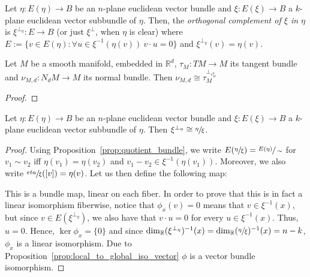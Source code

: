 \begin{definition} Let $\eta:E(\eta)\to B$ be an $n$-plane euclidean vector bundle and $\xi:E(\xi)\to B$ a $k$-plane euclidean vector subbundle of $\eta$. Then, the \emph{orthogonal complement of $\xi$ in $\eta$} is $\xi^{\perp_{\eta}}:E\to B$ (or just $\xi^{\perp}$, when $\eta$ is clear) where $E:=\{v\in E(\eta):\forall u\in\xi^{-1}(\eta(v))\ v\cdot u=0\}$ and $\xi^{\perp_{\eta}}(v)=\eta(v)$.
\end{definition}

\begin{proposition}\label{prop:tangent_normal_vb} Let $M$ be a smooth manifold, embedded in $\mathbb{R}^d$, $\tau_M:TM\to M$ its tangent bundle and $\nu_{M,d}:N_dM\to M$ its normal bundle. Then $\nu_{M,d}\cong\tau_M^{\perp_{\varepsilon_M^d}}$
\end{proposition}
\begin{proof}
\end{proof}

\begin{lemma} Let $\eta:E(\eta)\to B$ be an $n$-plane euclidean vector bundle and $\xi:E(\xi)\to B$ a $k$-plane euclidean vector subbundle of $\eta$. Then $\xi^{\perp_{\eta}}\cong\sfrac{\eta}{\xi}$.
\end{lemma}
\begin{proof} Using Proposition~\ref{prop:quotient_bundle}, we write $E(\sfrac{\eta}{\xi})=\sfrac{E(\eta)}{\sim}$ for $v_1\sim v_2$ iff $\eta(v_1)=\eta(v_2)$ and $v_1-v_2\in\xi^{-1}(\eta(v_1))$. Moreover, we also write $\sfrac{eta}{\xi}([v])=\eta(v)$. Let us then define the following map:
\begin{center}
\end{center}
This is a bundle map, linear on each fiber. In order to prove that this is in fact a linear isomorphism fiberwise, notice that $\phi_x(v)=0$ means that $v\in\xi^{-1}(x)$, but since $v\in E(\xi^{\perp_{\eta}})$, we also have that $v\cdot u=0$ for every $u\in\xi^{-1}(x)$. Thus, $u=0$. Hence, $\ker\phi_x=\{0\}$ and since $\dim_{\mathbb{R}}(\xi^{\perp_{\eta}})^{-1}(x)=\dim_{\mathbb{R}}(\sfrac{\eta}{\xi})^{-1}(x)=n-k$, $\phi_x$ is a linear isomorphism. Due to Proposition~\ref{prop:local_to_global_iso_vector} $\phi$ is a vector bundle isomorphism.
\end{proof}


